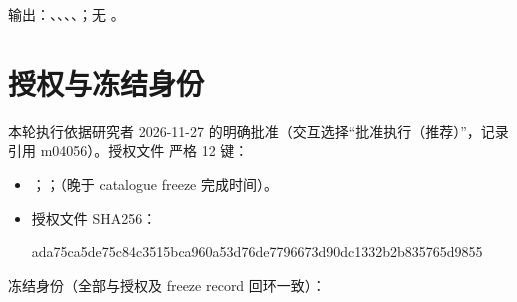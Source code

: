 \documentclass[UTF8,11pt,a4paper,fontset=windows]{ctexart}
\begin{document}
输出：、、、、；无 。

\section{授权与冻结身份}
本轮执行依据研究者 2026-11-27 的明确批准（交互选择“批准执行（推荐）”，记录引用 m04056）。授权文件  严格 12 键：

\begin{itemize}
\item {}；；（晚于 catalogue freeze 完成时间）。
\item 授权文件 SHA256：
\par{\small\ttfamily ada75ca5de75c84c3515bca960a53d76de7796673d90dc1332b2b835765d9855}\par
\end{itemize}

冻结身份（全部与授权及 freeze record 回环一致）：
\end{document}
